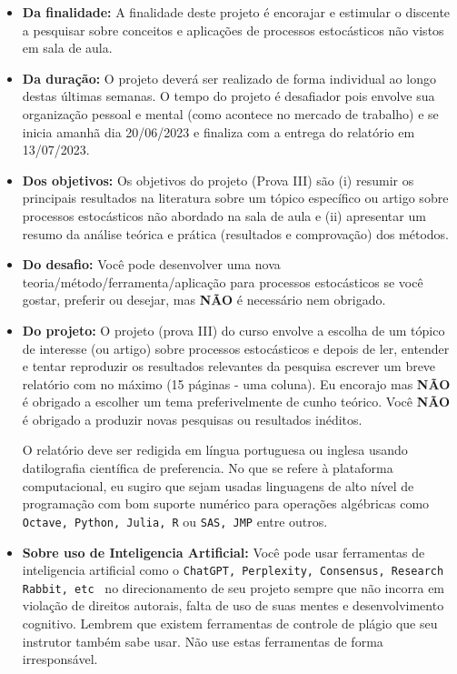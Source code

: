 \documentclass[a4paper,10pt,oneside,twocolumn]{Config/milktest}
\begin{document}
\begin{itemize}
\item {\bf Da finalidade:} A finalidade deste projeto é encorajar e estimular o discente a pesquisar sobre conceitos e aplicações de processos estocásticos não vistos em sala de aula. 

\item {\bf Da duração:} O projeto deverá ser realizado de forma individual ao longo destas últimas semanas. O tempo do projeto é desafiador pois envolve sua organização pessoal e mental (como acontece no mercado de trabalho)  e se inicia amanhã dia 20/06/2023 e finaliza com a  entrega do relatório em 13/07/2023.

\item {\bf Dos objetivos:}  Os objetivos do projeto (Prova III) são (i) resumir os principais resultados na literatura sobre um tópico específico ou artigo sobre processos estocásticos não abordado na sala de aula  e (ii) apresentar um resumo da análise teórica e prática (resultados e comprovação) dos métodos. 

\item {\bf Do desafio:} Você pode desenvolver uma nova teoria/método/ferramenta/aplicação para processos estocásticos se você gostar, preferir ou desejar, mas {\bf NÃO} é necessário nem obrigado.

\item {\bf Do projeto:} O projeto (prova III) do curso envolve a escolha de um tópico de interesse (ou artigo) sobre processos estocásticos e depois de ler, entender e tentar reproduzir os resultados relevantes da pesquisa  escrever um breve relatório com no máximo (15 páginas - uma coluna). Eu encorajo mas {\bf NÃO} é obrigado a escolher um tema preferivelmente de cunho teórico. Você {\bf NÃO} é obrigado a produzir novas pesquisas ou resultados inéditos. 

O relatório deve ser redigida em língua portuguesa ou inglesa usando datilografia científica de preferencia. No que se refere à plataforma computacional, eu sugiro que sejam  usadas linguagens de alto nível de programação com bom suporte numérico  para operações algébricas como {\tt Octave, Python, Julia, R} ou {\tt SAS, JMP} entre outros.

\item {\bf Sobre uso de Inteligencia Artificial:} Você pode usar ferramentas de inteligencia artificial como o {\tt ChatGPT, Perplexity, Consensus, Research Rabbit, etc
} no direcionamento de seu projeto sempre que não incorra em violação de direitos autorais, falta de uso de suas mentes e desenvolvimento cognitivo. Lembrem que existem ferramentas de controle de plágio que seu instrutor também sabe usar. Não use estas ferramentas de forma irresponsável. 


\end{itemize}
\end{document}
